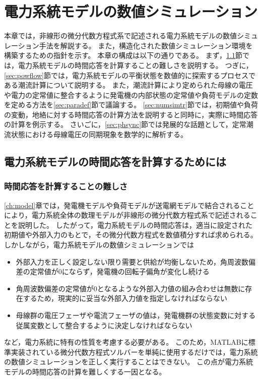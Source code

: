 \documentclass[tombow,dvipdfmx]{corona-a5-1.1}
\begin{document}
\chapter{電力系統モデルの数値シミュレーション}\label{chap:numcal}

本章では，非線形の微分代数方程式系で記述される電力系統モデルの数値シミュレーション手法を解説する。
また，構造化された数値シミュレーション環境を構築するための指針を示す。
本章の構成は以下の通りである。
まず，\ref{sec:howtocal}節では，電力系統モデルの時間応答を計算することの難しさを説明する。
つぎに，\ref{sec:powflow}節では，電力系統モデルの平衡状態を数値的に探索するプロセスである潮流計算について説明する。
また，潮流計算により定められた母線の電圧や電力の定常値に整合するように発電機の内部状態の定常値や負荷モデルの定数を定める方法を\ref{sec:paradef}節で議論する。
\ref{sec:numsimtr}節では，初期値や負荷の変動，地絡に対する時間応答の計算方法を説明すると同時に，実際に時間応答の計算を例示する。
さいごに，\ref{sec:phsync}節では発展的な話題として，定常潮流状態における母線電圧の同期現象を数学的に解析する。

\section{電力系統モデルの時間応答を計算するためには}\label{sec:howtocal}

\subsection{時間応答を計算することの難しさ}

\ref{ch:model}章では，発電機モデルや負荷モデルが送電網モデルで結合されることにより，電力系統全体の数理モデルが非線形の微分代数方程式系で記述されることを説明した。
したがって，電力系統モデルの時間応答は，適当に設定された初期値や外部入力のもとで，その微分代数方程式を数値積分すれば求められる。
しかしながら，電力系統モデルの数値シミュレーションでは
\begin{itemize}
\item 外部入力を正しく設定しない限り需要と供給が均衡しないため，角周波数偏差の定常値が0にならず，発電機の回転子偏角が変化し続ける
\item 角周波数偏差の定常値が0となるような外部入力値の組み合わせは無数に存在するため，現実的に妥当な外部入力値を指定しなければならない
\item 母線群の電圧フェーザや電流フェーザの値は，発電機群の状態変数に対する従属変数として整合するように決定しなければならない
\end{itemize}
など，電力系統に特有の性質を考慮する必要がある。
このため，MATLABに標準実装されている微分代数方程式ソルバーを単純に使用するだけでは，電力系統の数値シミュレーションを正しく実行することはできない。
この点が電力系統モデルの時間応答の計算を難しくする一因となる。
\end{document}
